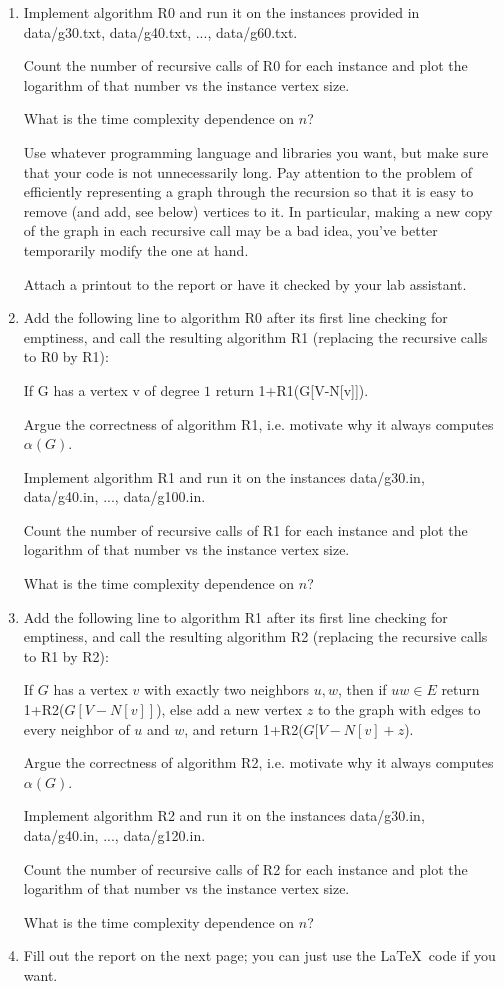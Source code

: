 \documentclass{tufte-handout}
\begin{document}
\begin{enumerate}
\item Implement algorithm R0 and run it on the instances provided in
  data/g30.txt, data/g40.txt, ..., data/g60.txt.
  
  Count the number of recursive calls of R0 for each instance and plot the
  logarithm of that number vs the instance vertex size. 
  
  What is the time complexity dependence on $n$?
  
  Use whatever programming language and libraries you want, but make
  sure that your code is not unnecessarily long. Pay attention to the problem
  of efficiently representing a graph through the recursion so that it is easy to remove (and add, see below) vertices
   to it. In particular, making a new copy of the graph in each recursive call may be a bad idea, you've better temporarily modify the one at hand.
   
    Attach a printout to the report or have it checked by your lab
  assistant.
 \item  Add the following line to algorithm R0 after its first line checking for emptiness, and call the resulting algorithm R1 (replacing the recursive calls to R0 by R1):
 
 If G has a vertex v of degree $1$ return 1+R1(G[V-N[v]]).
 
 Argue the correctness of algorithm R1, i.e. motivate why it always computes $\alpha(G)$.
 
 Implement algorithm R1 and run it on the instances
  data/g30.in, data/g40.in, ..., data/g100.in.

  Count the number of recursive calls of R1 for each instance and plot the
  logarithm of that number vs the instance vertex size. 
  
  What is the time complexity dependence on $n$?

 \item Add the following line to algorithm R1 after its first line checking for emptiness, and call the resulting algorithm R2 (replacing the recursive calls to R1 by R2):
 
 If $G$ has a vertex $v$ with exactly two neighbors $u,w$, then if $uw\in E$ return 1+R2($G[V-N[v]]$),
 else add a new vertex $z$ to the graph with edges to every neighbor of $u$ and $w$, and
 return 1+R2($G[V-N[v]+z$).
 
 Argue the correctness of algorithm R2, i.e. motivate why it always computes $\alpha(G)$.
 
 Implement algorithm R2 and run it on the instances
  data/g30.in, data/g40.in, ..., data/g120.in.

  Count the number of recursive calls of R2 for each instance and plot the
  logarithm of that number vs the instance vertex size. 
  
  What is the time complexity dependence on $n$?

\item Fill out the report on the next page; you can just use the
  \LaTeX\ code if you want.
\end{enumerate}
\end{document}
